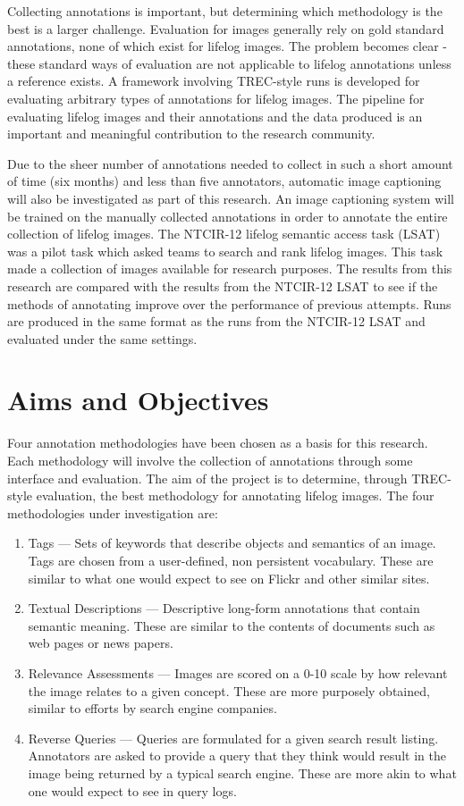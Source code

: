 Collecting annotations is important, but determining which methodology is the best is a larger challenge. Evaluation for images generally rely on gold standard annotations, none of which exist for lifelog images. The problem becomes clear - these standard ways of evaluation are not applicable to lifelog annotations unless a reference exists. A framework involving TREC-style runs is developed for evaluating arbitrary types of annotations for lifelog images. The pipeline for evaluating lifelog images and their annotations and the data produced is an important and meaningful contribution to the research community. 

Due to the sheer number of annotations needed to collect in such a short amount of time (six months) and less than five annotators, automatic image captioning will also be investigated as part of this research. An image captioning system will be trained on the manually collected annotations in order to annotate the entire collection of lifelog images. The NTCIR-12 lifelog semantic access task (LSAT) was a pilot task which asked teams to search and rank lifelog images. This task made a collection of images available for research purposes. The results from this research are compared with the results from the NTCIR-12 LSAT to see if the methods of annotating improve over the performance of previous attempts. Runs are produced in the same format as the runs from the NTCIR-12 LSAT and evaluated under the same settings.

\section{Aims and Objectives}

Four annotation methodologies have been chosen as a basis for this research. Each methodology will involve the collection of annotations through some interface and evaluation. The aim of the project is to determine, through TREC-style evaluation, the best methodology for annotating lifelog images. The four methodologies under investigation are: 

\begin{enumerate}
    \item Tags --- Sets of keywords that describe objects and semantics of an image. Tags are chosen from a user-defined, non persistent vocabulary. These are similar to what one would expect to see on Flickr and other similar sites.
    \item Textual Descriptions --- Descriptive long-form annotations that contain semantic meaning. These are similar to the contents of documents such as web pages or news papers.
    \item Relevance Assessments --- Images are scored on a 0-10 scale by how relevant the image relates to a given concept. These are more purposely obtained, similar to  efforts by search engine companies.
    \item Reverse Queries --- Queries are formulated for a given search result listing. Annotators are asked to provide a query that they think would result in the image being returned by a typical search engine. These are more akin to what one would expect to see in query logs.
\end{enumerate}

